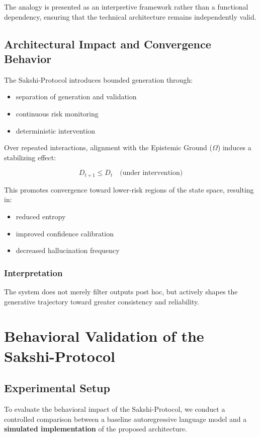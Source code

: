 \documentclass[12pt,a4paper]{article}
\begin{document}
The analogy is presented as an interpretive framework rather than a functional dependency, ensuring that the technical architecture remains independently valid.

\subsection{Architectural Impact and Convergence Behavior}
The Sakshi-Protocol introduces bounded generation through:

\begin{itemize}
\item separation of generation and validation
\item continuous risk monitoring
\item deterministic intervention
\end{itemize}

Over repeated interactions, alignment with the Epistemic Ground ($\Omega$) induces a stabilizing effect:

\[
D_{t+1} \leq D_t \quad \mbox{(under intervention)}
\]

This promotes convergence toward lower-risk regions of the state space, resulting in:

\begin{itemize}
\item reduced entropy
\item improved confidence calibration
\item decreased hallucination frequency
\end{itemize}

\subsubsection*{Interpretation}
The system does not merely filter outputs post hoc, but actively shapes the generative trajectory toward greater consistency and reliability.

\section{Behavioral Validation of the Sakshi-Protocol}

\subsection{Experimental Setup}

To evaluate the behavioral impact of the Sakshi-Protocol, we conduct a controlled comparison between a baseline autoregressive language model and a \textbf{simulated implementation} of the proposed architecture.
\end{document}
